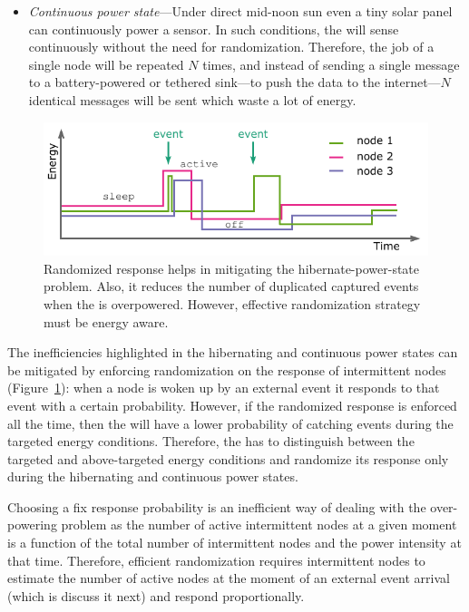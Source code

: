 \begin{itemize}
		\item \label{it:continuous} \textit{Continuous power state}---Under direct mid-noon sun even a tiny solar panel can continuously power a sensor. In such conditions, the \sys will sense continuously without the need for randomization. Therefore, the job of a single node will be repeated $N$ times, and instead of sending a single message to a battery-powered or tethered sink---to push the data to the internet---$N$ identical messages will be sent which waste a lot of energy. 
				
\end{itemize}
%
\begin{figure}
		\centering
		\includegraphics[width=\columnwidth]{figures/randomized_response}
		\caption{Randomized response helps in mitigating the hibernate-power-state problem. Also, it reduces the number of duplicated captured events when the \sys is overpowered. However, effective randomization strategy must be energy aware.}
		\label{fig:rand}
\end{figure} 

The inefficiencies highlighted in the hibernating and continuous power states can be mitigated by enforcing randomization on the response of intermittent nodes (Figure~\ref{fig:rand}): when a node is woken up by an external event it responds to that event with a certain probability. However, if the randomized response is enforced all the time, then the \sys will have a lower probability of catching events during the targeted energy conditions. Therefore, the \sys has to distinguish between the targeted and above-targeted energy conditions and randomize its response only during the hibernating and continuous power states. 


Choosing a fix response probability is an inefficient way of dealing with the over-powering problem as the number of active intermittent nodes at a given moment is a function of the total number of intermittent nodes and the power intensity at that time. Therefore, efficient randomization requires intermittent nodes to estimate the number of active nodes at the moment of an external event arrival (which is discuss it next) and respond proportionally.


